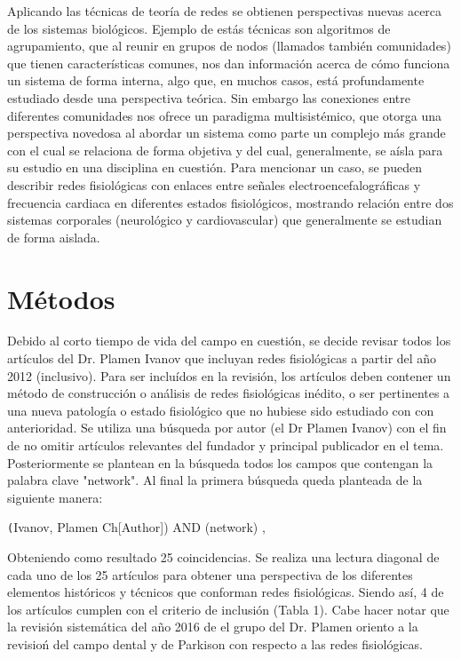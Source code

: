 \documentclass[twoside,twocolumn]{article}
\begin{document}
Aplicando las técnicas de teoría de redes se obtienen perspectivas nuevas acerca de los sistemas biológicos.
Ejemplo de estás técnicas son algoritmos de agrupamiento, que al reunir en grupos de nodos (llamados también comunidades) que tienen características comunes, nos dan información acerca de cómo funciona un sistema de forma interna, algo que, en muchos casos, está profundamente estudiado desde una perspectiva teórica.
Sin embargo las conexiones entre diferentes comunidades nos ofrece un paradigma multisistémico, que otorga una perspectiva novedosa al abordar un sistema como parte un complejo más grande con el cual se relaciona de forma objetiva y del cual, generalmente, se aísla para su estudio en una disciplina en cuestión.
Para mencionar un caso, se pueden describir redes fisiológicas con enlaces entre señales electroencefalográficas y frecuencia cardiaca en diferentes estados fisiológicos, mostrando relación entre dos sistemas corporales (neurológico y cardiovascular) que generalmente se estudian de forma aislada.


\section{Métodos}
Debido al corto tiempo de vida del campo en cuestión, se decide revisar todos los artículos del Dr. Plamen Ivanov que incluyan redes fisiológicas a partir del año 2012 (inclusivo).
Para ser incluídos en la revisión, los artículos deben contener un método de construcción o análisis de redes fisiológicas inédito, o ser pertinentes a una nueva patología o estado fisiológico que no hubiese sido estudiado con con anterioridad.
Se utiliza una búsqueda por autor (el Dr Plamen Ivanov) con el fin de no omitir artículos relevantes del fundador y principal publicador en el tema. Posteriormente se plantean en la búsqueda todos los campos que contengan la palabra clave "network". Al final la primera búsqueda queda planteada de la siguiente manera:

\texttt(Ivanov, Plamen Ch[Author]) AND (network) ,

Obteniendo como resultado 25 coincidencias. Se realiza una lectura diagonal de cada uno de los 25 artículos para obtener una perspectiva de los diferentes elementos históricos y técnicos que conforman redes fisiológicas.
Siendo así, 4 de los artículos cumplen con el criterio de inclusión (Tabla 1). Cabe hacer notar que la revisión sistemática del año 2016 de el grupo del Dr. Plamen\cite{ivanov2016focus} oriento a la revisioń del campo dental\cite{scala2014complex} y de Parkison\cite{monti2018network} con respecto a las redes fisiológicas.
\end{document}
